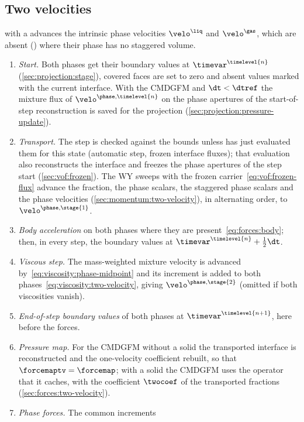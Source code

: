 \subsection{Two velocities}\label{sec:overview:step-two}
 with a  advances the intrinsic phase
velocities $\velo^{\liq}$ and $\velo^{\gas}$, which are absent ()
where their phase has no staggered volume.
\begin{enumerate}
\item \emph{Start.} Both phases get their boundary values at
  $\timevar^{\timelevel{n}}$ (\cref{sec:projection:stage}), covered faces are
  set to zero and absent values marked with the current interface. With the
  CMDGFM and $\dt<\dtref$ the mixture flux of $\velo^{\phase,\timelevel{n}}$
  on the phase apertures of the start-of-step reconstruction is saved for the
  projection (\cref{sec:projection:pressure-update}).
\item \emph{Transport.} The step is checked against the bounds unless
   has just evaluated them for this state (automatic step,
  frozen interface fluxes); that evaluation also reconstructs the interface and
  freezes the phase apertures of the step start (\cref{sec:vof:frozen}). The
  WY sweeps with the frozen carrier~\cref{eq:vof:frozen-flux} advance the
  fraction, the phase scalars, the
  staggered phase scalars and the phase velocities
  (\cref{sec:momentum:two-velocity}), in alternating order, to
  $\velo^{\phase,\stage{1}}$.
\item \emph{Body acceleration} on both phases where they are
  present~\cref{eq:forces:body}; then, in every step, the boundary values at
  $\timevar^{\timelevel{n}}+\half\dt$.
\item \emph{Viscous step.} The mass-weighted mixture velocity is advanced
  by~\cref{eq:viscosity:phase-midpoint} and its increment is added to both
  phases~\cref{eq:viscosity:two-velocity}, giving $\velo^{\phase,\stage{2}}$
  (omitted if both viscosities vanish).
\item \emph{End-of-step boundary values} of both phases at
  $\timevar^{\timelevel{n+1}}$, here before the forces.
\item \emph{Pressure map.} For the CMDGFM without a solid the transported
  interface is reconstructed and the one-velocity coefficient rebuilt, so
  that $\forcemaptv=\forcemap$; with a solid the CMDGFM uses the operator
  that it caches, with the coefficient $\twocoef$ of the transported
  fractions (\cref{sec:forces:two-velocity}).
\item \emph{Phase forces.} The common increments

\end{enumerate}
